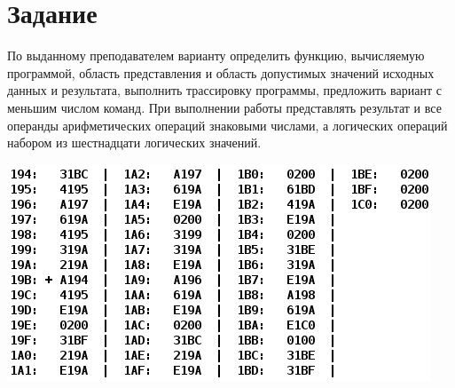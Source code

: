 \documentclass{article}
\begin{document}
\itmo[
      variant=666666666,
      labn=2,
      discipline=Основы профессиональной деятельности,
      group=P3115,
      student=Владимир Мацюк,
      teacher=Пашнин Александр Денисович
]
\lstset{language=Python}

\tableofcontents

\section{Задание}
По выданному преподавателем варианту определить функцию, вычисляемую программой, область представления и область допустимых значений исходных данных и результата, выполнить трассировку программы, предложить вариант с меньшим числом команд. При выполнении работы представлять результат и все операнды арифметических операций знаковыми числами, а логических операций набором из шестнадцати логических значений.
\begin{center}
      \includegraphics[scale=0.5]{task.png}
\end{center}
\end{document}
